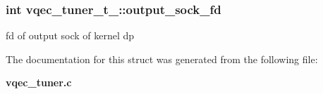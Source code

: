 \subsubsection{\setlength{\rightskip}{0pt plus 5cm}int \bf{vqec\_\-tuner\_\-t\_\-::output\_\-sock\_\-fd}}\label{structvqec__tuner__t___e0b38260bd1978c725a2ee002de56e08}


fd of output sock of kernel dp 

The documentation for this struct was generated from the following file:\begin{CompactItemize}
\item 
\bf{vqec\_\-tuner.c}\end{CompactItemize}
